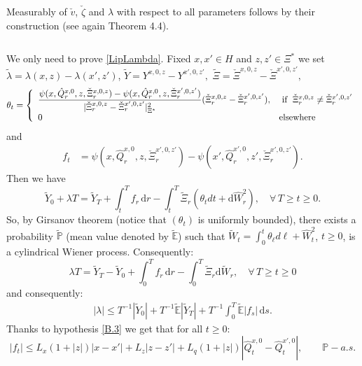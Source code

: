 \documentclass[reqno,a4paper,11 pt]{article}
\def \E {\mathbb{E}}
\newcommand{\rmd}{\mathrm{d}}
\numberwithin{equation}{section}
\begin{document}
 Measurably of $\check{v}$, $\check{\zeta}$ and $\lambda$ with respect to all parameters follows by their construction (see again \cite{FuHuTes} Theorem 4.4).

$ $

We only need to prove \eqref{LipLambda}. 
Fixed $x,x' \in H$ and $z, z' \in \Xi^*$ we set $\widetilde{\lambda}=\lambda(x,z)-\lambda(x',z')$, $\widetilde{Y}= Y^{x,0,z} -Y^{x',0,z'},$ $ \widetilde{\Xi} =\check{\Xi}^{x,0,z} -\check{\Xi}^{x',0,z'},$ 
\begin{equation*}
\theta_t = \left\{ \begin{array} {ll}  \displaystyle \frac{\psi(x,\hat{Q}^{x,0}_r,z,\check{\Xi}^{x,0,z}_r)-\psi(x,\hat{Q}^{x,0}_r,z,\check{\Xi}^{x',0,z'}_r) }{|\check{\Xi}^{x,0,z}_r-\check{\Xi}^{x',0,z'}_r|^2_{\Xi ^*}}(\check{\Xi}^{x,0,z}_r-\check{\Xi}^{x',0,z'}_r), &  \hbox{ if }\; \check{\Xi}^{x,0,z}_r\not=\check{\Xi}^{x',0,z'}_r  \\
0 & \text{elsewhere}
\end{array}
\right. 
\end{equation*}
and
\begin{align*}
f_t &= \psi(x,\hat{Q}^{x,0}_r,z,\check{\Xi}^{x',0,z'}_r)- \psi(x',\hat{Q}^{x',0}_r,z',\check{\Xi}^{x',0,z'}_r ).\end{align*}
Then we have
\begin{equation*}
\widetilde{Y}_0+\lambda T= \widetilde{Y}_T + \int_t^T  f_r \,\rmd r - \int_t^T\widetilde{\Xi}_r (\theta_t dt +\rmd \hat{W}_r^{2}), \quad \forall \,  T \geq  t\geq 0.
\end{equation*}
So, by Girsanov theorem (notice that $(\theta_t)$ is uniformly bounded), there exists a probability  $\widetilde{\mathbb{P}}$  (mean value denoted by  $\widetilde{\mathbb{E}}$) 
such that $\widetilde{W}_t=\int_0^t \theta_{\ell} d\ell +\hat{W}_t^{2}$, $t\geq 0$,  is a cylindrical Wiener process. Consequently:
\begin{equation*}
{\lambda}T= \widetilde{Y}_T- \widetilde{Y}_0  + \int_0^T  f_r \,\rmd r - \int_0^T\widetilde{\Xi}_r \rmd \widetilde{W}_r, \quad \forall \,  T \geq  t\geq 0
\end{equation*}
and consequently:
\begin{align}\label{stimaquasifinalelambda}
| \lambda|\leq T^{-1}|\widetilde{Y}_0| + T^{-1}\widetilde{\E}|\widetilde{Y}_T|+ T^{-1} \int_0^T  \widetilde{\E} |f_s| \, \rmd s .
\end{align}
Thanks to hypothesis \ref{B.3} we get that for all $t \geq 0$:
\begin{equation*}
|f_t| \leq L_x(1+|z|)|x-x'| + L_z |z-z'| + L_{q}(1+|z|)|\hat{Q}^{x,0}_t-\hat{Q}^{x',0}_t| , \qquad \mathbb{P}-a.s.
\end{equation*}
\end{document}
